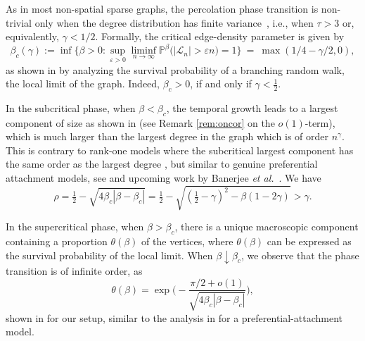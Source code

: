\documentclass[a4paper, a4wide, 10pt, reqno]{amsart}
\theoremstyle{plain}
\theoremstyle{definition}
\numberwithin{equation}{section}
\newcommand{\Prob}{\mathbb{P}}
\newcommand{\sL}{{\mathscr L}}
\begin{document}
 
\smallskip
As in most non-spatial sparse graphs, the percolation phase transition is non-trivial only when the degree distribution has finite variance~\cite{DerMor13, morters2023tangent}, i.e., when $\tau>3$ or, equivalently, $\gamma<1/2$.
Formally, the critical edge-density parameter is given by
\begin{equation}\label{eq:beta-c}
\beta_c(\gamma):=\inf\Big\{\beta>0 \colon \sup_{\varepsilon>0}\liminf_{n\to\infty} \Prob^\beta\big(|\sL_n|>\varepsilon n\big)=1\Big\}\ = \ \max(1/4 - \gamma/2, 0),
\end{equation}
as shown in \cite{morters2023tangent} by analyzing the survival probability of a branching random walk, the local limit of the graph.
Indeed, $\beta_c>0$, if and only if $\gamma<\frac12$.


\medskip
In the subcritical phase, when 
$\beta<\beta_c$, the temporal growth leads to a largest component of size
 as shown in \cite{MS25} (see Remark \ref{rem:oncor} on the $o(1)$-term), which is much larger than the largest degree in the graph which is of order $n^\gamma$.  This is contrary to rank-one models  where the subcritical largest component has the same order as the largest degree \cite{J08, Lienau}, but similar to genuine preferential attachment models, see \cite{Ray} and upcoming work by Banerjee \emph{et al.}~\cite{BanerjeeSubcritial}. We have 
\begin{equation}\rho=\tfrac{1}{2}-\sqrt{4\beta_c|\beta-\beta_c|}=\tfrac12-\sqrt{(\tfrac12-\gamma)^2-\beta(1-2\gamma)}
>\gamma.\label{eq:rho-sub}\end{equation}

\smallskip
In the supercritical phase, when
$\beta>\beta_c$, there is a unique macroscopic component containing a proportion $\theta(\beta)$ of the vertices, where $\theta(\beta)$ can be expressed as the survival probability of the local limit. When $\beta\downarrow\beta_c$, we observe that the phase transition is of infinite order, as
\begin{equation}\label{eq:barely-sup}
\theta(\beta)=
\exp\bigg(-\frac{\pi/2+o(1)}{\sqrt{4\beta_c|\beta-\beta_c|}}\bigg), 
\end{equation}
 shown in \cite{Leif} for our setup, similar to the analysis in \cite{EMO} for a preferential-attachment model. 
\end{document}
